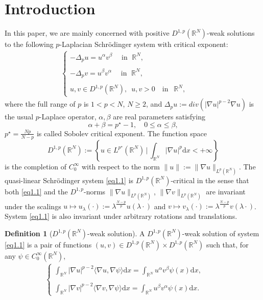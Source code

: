 \documentclass[12pt]{amsart}
\theoremstyle{definition}
\newtheorem{defn}[thm]{Definition}
\theoremstyle{remark}
\theoremstyle{conclusion}
\theoremstyle{conjecture}
\numberwithin{equation}{section}
\newcommand{\R}{\mathbb{R}}
\begin{document}
\section{Introduction}
In this paper, we are mainly concerned with positive $D^{1,p}(\R^{N})$-weak solutions to the following $p$-Laplacian Schr\"{o}dinger system with critical exponent:
\begin{align}\label{eq1.1}
\left\{ \begin{array}{ll} \displaystyle
-\Delta_p u = u^{\alpha}v^{\beta}  \, \ \ \ \ \ \mbox{in}\,\ \ \R^N, \\ \\
-\Delta_p v = u^{\beta}v^{\alpha}  \,\  \ \ \ \ \mbox{in}\,\ \ \R^N, \\ \\
u, v \in D^{1,p}(\R^N),\,\,\,u, v>0 \quad \mbox{in}\,\, \ \ \R^N,
\end{array}
\right.\hspace{1cm}
\end{align}
where the full range of $p$ is $1<p<N$, $N\geq2$, and $\Delta_p u:=div (|\nabla u|^{p-2} \nabla u)$ is the usual $p$-Laplace operator, $\alpha, \beta$ are real parameters satisfying
$$ \alpha+ \beta = p^{\star}-1,\quad 0\leq \alpha \leq \beta, $$
$p^{\star}=\frac{Np}{N-p}$ is called Sobolev critical exponent. The function space
$$ D^{1,p}(\R^N):=\left\{ u\in L^{p^{\star}}(\R^N) \, \bigg| \, \int_{\R^N} |\nabla u|^p \mathrm{d}x <+\infty \right\}$$
is the completion of $C_0^\infty$ with respect to the norm $\| u \|:=\| \nabla u \|_{L^p(\R^N)}$. The quasi-linear Schr\"{o}dinger system \eqref{eq1.1} is $D^{1,p}(\R^{N})$-critical in the sense that both \eqref{eq1.1} and the $D^{1,p}$-norms $\| \nabla u \|_{L^p(\R^N)}$, $\| \nabla v\|_{L^p(\R^N)}$ are invariant under the scalings $u\mapsto u_{\lambda}(\cdot):=\lambda^{\frac{N-p}{p}}u(\lambda\cdot)$ and $v\mapsto v_{\lambda}(\cdot):=\lambda^{\frac{N-p}{p}}v(\lambda\cdot)$. System \eqref{eq1.1} is also invariant under arbitrary rotations and translations.

\begin{defn}[$D^{1,p}(\R^{N})$-weak solution]\label{weak}
A $D^{1,p}(\R^{N})$-weak solution of system \eqref{eq1.1} is a pair of functions $(u,v)\in D^{1,p}(\R^N)\times D^{1,p}(\R^N)$ such that, for any $\psi \in C_0^\infty(\R^N)$,
\begin{align}
\left\{ \begin{array}{ll} \displaystyle
\int_{\R^N} |\nabla u|^{p-2} \langle \nabla u, \nabla\psi\rangle \mathrm{d}x = \int_{\R^N} u^{\alpha}v^{\beta}\psi(x)\mathrm{d}x, \\ \\
\int_{\R^N} |\nabla v|^{p-2} \langle \nabla v, \nabla\psi\rangle \mathrm{d}x = \int_{\R^N} u^{\beta}v^{\alpha}\psi(x)\mathrm{d}x.
\end{array}
\right.\hspace{1cm}
\end{align}
\end{defn}
\end{document}
